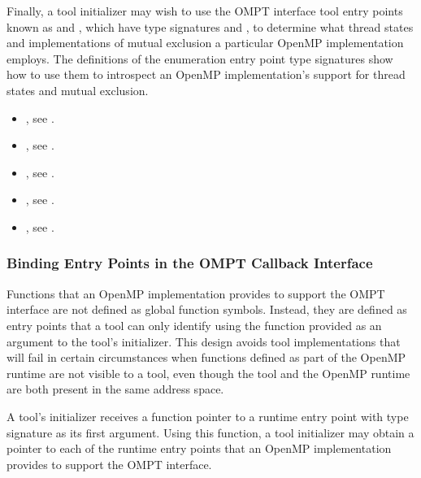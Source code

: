 Finally, a tool initializer may wish to use the OMPT interface tool
entry points known as  and
, which have type signatures
 and
, to determine what thread
states and implementations of mutual exclusion a particular OpenMP
implementation employs. The definitions of the enumeration entry point
type signatures show how to use them to introspect an OpenMP
implementation's support for thread states and mutual exclusion.

\crossreferences
\begin{itemize}
\item {}, see .
\item {}, see .
\item {}, see .
\item {}, see .
\item {}, see
  .
\end{itemize}

\subsubsection{Binding Entry Points in the OMPT Callback Interface}
\label{sec:ompt-bind}

Functions that an OpenMP implementation provides to support the OMPT interface
are not defined as global function symbols. Instead, they are defined as entry points 
that a tool can only identify using the  function provided as an
argument to the tool's initializer. This design avoids tool
implementations that
will fail in certain circumstances when functions defined as part of
the OpenMP runtime are not visible to a tool, even though the tool and
the OpenMP runtime are both present in the same address space.
 
A tool's initializer receives a function pointer to a
 runtime entry point with type signature
  as its first argument. Using this
function, a tool initializer may obtain a pointer to
each of the runtime entry points that an OpenMP implementation provides to support
the OMPT interface.

